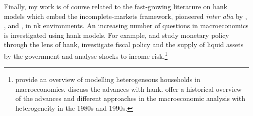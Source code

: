\documentclass[12pt]{article} %
\numberwithin{equation}{section} %
\numberwithin{figure}{section}
\numberwithin{table}{section}
\begin{document}
Finally, my work is of course related to the fast-growing literature on \Gls{hank} models which embed the incomplete-markets framework, pioneered \textit{inter alia} by \textcite{bewley1986}, \textcite{im1989}, \textcite{huggett1993} and \textcite{aiyagari1994}, in \Gls{nk} environments. An increasing number of questions in macroeconomics is investigated using \Gls{hank} models. For example, \textcite{mckay2016} and \textcite{kaplan2018} study monetary policy through the lens of \Gls{hank}, \textcite{bayer2023} investigate fiscal policy and the supply of liquid assets by the government and \textcite{bayer2019} analyse shocks to income risk.\footnote{\textcite{heath2009} provide an overview of modelling heterogeneous households in macroeconomics. \textcite{kv2018} discuss the advances with \Gls{hank}. \textcite{cherrier2023} offer a historical overview of the advances and different approaches in the macroeconomic analysis with heterogeneity in the 1980s and 1990s.}


\end{document}
